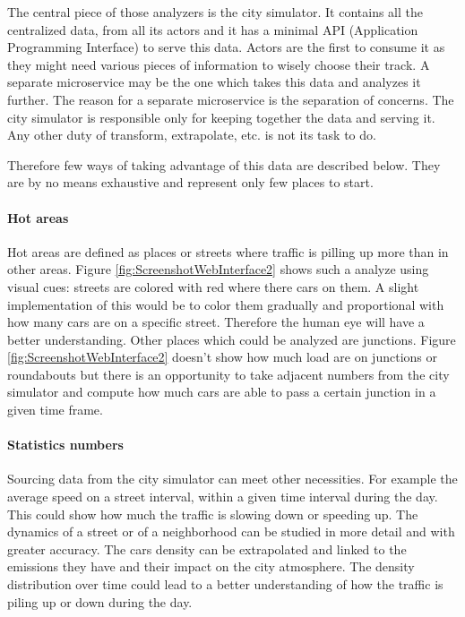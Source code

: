 \documentclass[a4paper,12pt,twoside]{book}
\begin{document}
The central piece of those analyzers is the city simulator. It contains all the centralized data, from all its actors and it has a minimal API (Application Programming Interface) to serve this data. Actors are the first to consume it as they might need various pieces of information to wisely choose their track. A separate microservice may be the one which takes this data and analyzes it further. The reason for a separate microservice is the separation of concerns. The city simulator is responsible only for keeping together the data and serving it. Any other duty of transform, extrapolate, etc. is not its task to do.

Therefore few ways of taking advantage of this data are described below. They are by no means exhaustive and represent only few places to start.

\paragraph{Hot areas}

Hot areas are defined as places or streets where traffic is pilling up more than in other areas. Figure \ref{fig:ScreenshotWebInterface2} \citep{microservicestrafficsimulation} shows such a analyze using visual cues: streets are colored with red where there cars on them. A slight implementation of this would be to color them gradually and proportional with how many cars are on a specific street. Therefore the human eye will have a better understanding. Other places which could be analyzed are junctions. Figure \ref{fig:ScreenshotWebInterface2} doesn't show how much load are on junctions or roundabouts but there is an opportunity to take adjacent numbers from the city simulator and compute how much cars are able to pass a certain junction in a given time frame.

\paragraph{Statistics numbers}

Sourcing data from the city simulator can meet other necessities. For example the average speed on a street interval, within a given time interval during the day. This could show how much the traffic is slowing down or speeding up. The dynamics of a street or of a neighborhood can be studied in more detail and with greater accuracy. The cars density can be extrapolated and linked to the emissions they have and their impact on the city atmosphere. The density distribution over time could lead to a better understanding of how the traffic is piling up or down during the day. 
\end{document}

